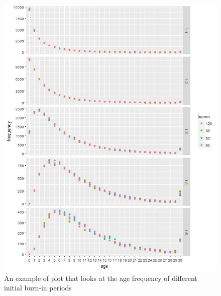 \vspace*{3mm}
\begin{figure}[htp]
	\includegraphics[scale=0.8]{Figures/Initial_age_comp_row_1.jpg}
	\caption{An example of plot that looks at the age frequency of different initial burn-in periods}\label{fig:initial_compare}
\end{figure}
